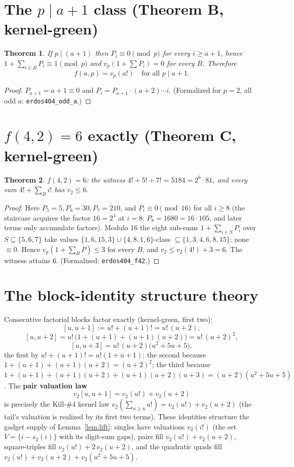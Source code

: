 \documentclass{article}
\newtheorem{theorem}{Theorem}
\newcommand{\vpp}{v_p}
\begin{document}
\section{The $p \mid a{+}1$ class (Theorem B, kernel-green)}

\begin{theorem}\label{thm:B}
If $p \mid (a+1)$ then $P_i \equiv 0 \pmod p$ for every $i \ge a{+}1$, hence
$1 + \sum_{i \in B} P_i \equiv 1 \pmod p$ and $\vpp(1+\sum P_i) = 0$ for
\emph{every} $B$.  Therefore
\[ \boxed{f(a,p) = \vpp(a!) \quad \text{for all } p \mid a{+}1.} \]
\end{theorem}
\begin{proof}
$P_{a+1} = a{+}1 \equiv 0$ and $P_i = P_{a+1} \cdot (a{+}2)\cdots i$.
(Formalized for $p = 2$, all odd $a$: \texttt{erdos404\_odd\_a}.)
\end{proof}

\section{$f(4,2) = 6$ exactly (Theorem C, kernel-green)}

\begin{theorem}\label{thm:C}
$f(4,2) = 6$: the witness $4! + 5! + 7! = 5184 = 2^6 \cdot 81$, and every
sum $4! + \sum_B i!$ has $v_2 \le 6$.
\end{theorem}
\begin{proof}
Here $P_5 = 5, P_6 = 30, P_7 = 210$, and $P_i \equiv 0 \pmod{16}$ for all
$i \ge 8$ (the staircase acquires the factor $16 = 2^4$ at $i = 8$:
$P_8 = 1680 = 16\cdot 105$, and later terms only accumulate factors).
Modulo 16 the eight sub-sums $1 + \sum_{i \in S} P_i$ over
$S \subseteq \{5,6,7\}$ take values
$\{1, 6, 15, 3\} \cup \{4, 8, 1, 6\}$-class $\subseteq \{1,3,4,6,8,15\}$:
none $\equiv 0$.  Hence $\vpp(1+\sum_B P) \le 3$ for every $B$, and
$v_2 \le v_2(4!) + 3 = 6$.  The witness attains 6.
(Formalized: \texttt{erdos404\_f42}.)
\end{proof}

\section{The block-identity structure theory}

Consecutive factorial blocks factor exactly (kernel-green, first two):
\[
  [u, u{+}1] := u! + (u{+}1)! = u!\,(u+2),
\]
\[
  [u, u{+}2] = u!\,\bigl(1 + (u{+}1) + (u{+}1)(u{+}2)\bigr) = u!\,(u+2)^2,
\]
\[
  [u, u{+}3] = u!\,(u+2)\bigl(u^2 + 5u + 5\bigr),
\]
the first by $u! + (u{+}1)! = u!(1 + u + 1)$; the second because
$1 + (u{+}1) + (u{+}1)(u{+}2) = (u{+}2)^2$; the third because
$1 + (u{+}1) + (u{+}1)(u{+}2) + (u{+}1)(u{+}2)(u{+}3) = (u+2)(u^2+5u+5)$.
The \textbf{pair valuation law}
\[ v_2[u, u{+}1] = v_2(u!) + v_2(u+2) \]
is precisely the Kill-\#4 kernel law $v_2(\sum_{a\ge u}a!) = v_2(u!) + v_2(u+2)$
(the tail's valuation is realized by its first two terms).
These identities structure the gadget supply of Lemma~\ref{lem:lift}:
singles have valuations $v_2(i!)$ (the set $V = \{i - s_2(i)\}$ with its
digit-sum gaps), pairs fill $v_2(u!) + v_2(u+2)$, square-triples fill
$v_2(u!) + 2\,v_2(u+2)$, and the quadratic quads fill
$v_2(u!) + v_2(u+2) + v_2(u^2+5u+5)$.
\end{document}
